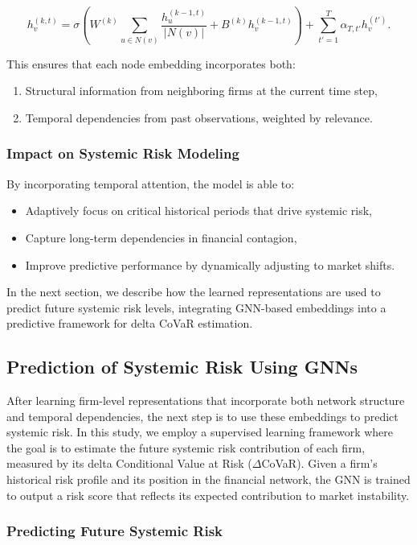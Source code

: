 \documentclass[preprint,12pt,authoryear]{elsarticle}
\begin{document}
\[
h_v^{(k,t)} = \sigma \left( W^{(k)} \sum_{u \in N(v)} \frac{h_u^{(k-1,t)}}{|N(v)|} + B^{(k)} h_v^{(k-1,t)} \right) + \sum_{t'=1}^{T} \alpha_{T,t'} h_v^{(t')}.
\]

This ensures that each node embedding incorporates both:
\begin{enumerate}
    \item Structural information from neighboring firms at the current time step,
    \item Temporal dependencies from past observations, weighted by relevance.
\end{enumerate}

\subsubsection{Impact on Systemic Risk Modeling}  

By incorporating temporal attention, the model is able to:
\begin{itemize}
    \item Adaptively focus on critical historical periods that drive systemic risk,
    \item Capture long-term dependencies in financial contagion,
    \item Improve predictive performance by dynamically adjusting to market shifts.
\end{itemize}

In the next section, we describe how the learned representations are used to predict future systemic risk levels, integrating GNN-based embeddings into a predictive framework for delta CoVaR estimation.

\subsection{Prediction of Systemic Risk Using GNNs}  

After learning firm-level representations that incorporate both network structure and temporal dependencies, the next step is to use these embeddings to predict systemic risk. In this study, we employ a supervised learning framework where the goal is to estimate the future systemic risk contribution of each firm, measured by its delta Conditional Value at Risk (\(\Delta\)CoVaR). Given a firm’s historical risk profile and its position in the financial network, the GNN is trained to output a risk score that reflects its expected contribution to market instability.  

\subsubsection{Predicting Future Systemic Risk}  
\end{document}
